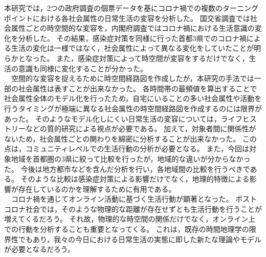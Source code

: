 \documentclass[paper={210mm,297mm},line_length=35zw,number_of_lines=31,head_space=30mm,gutter=40mm,baselineskip=2.0zw,headfoot_verticalposition=1.5zw]{jlreq}
\begin{document}
本研究では，2つの政府調査の個票データを基にコロナ禍での複数のターニングポイントにおける各社会属性の日常生活の変容を分析した。
国交省調査では社会属性ごとの時空間的な変容を，内閣府調査ではコロナ禍における生活意識の変化を分析した。
その結果，感染症対策を同様に行った首都3県でのコロナ禍による生活の変化は一様ではなく，社会属性によって異なる変化をしていたことが明らかとなった。
また，感染症対策によって時空間が変容をするだけでなく，生活の意識も同様に変化することが分かった。\\
　空間的な変容を捉えるために時空間経路図を作成したが，本研究の手法では一部の社会属性は表すことが出来なかった。
各時間帯の最頻値を算出することで社会属性全体のモデル化を行ったため，自宅にいることの多い社会属性や活動を行うタイミングが極端に異なる社会属性の時空間経路図を作成するのには限界があった。
そのようなモデル化しにくい日常生活の変容については，ライフヒストリーなどの質的研究による視点が必要である。
加えて，対象者間に関係性がないため，社会属性ごとの関わりを綿密に分析することが出来なかった。
この点は，コミュニティレベルでの生活行動の分析が必要となる。
また，今回は対象地域を首都圏の3県に絞って比較を行ったが，地域的な違いが分からなかった。
今後は地方都市などを含んだ分析を行い，各地域間の比較を行うべきである。
そのような比較は感染症対策による影響だけでなく，地理的特徴による影響が存在しているのかを理解するために有用である。\\
　コロナ禍を通じてオンライン活動に基づく生活行動が顕著となった。
ポストコロナ社会では，そのような物理的な距離が存在せずとも生活行動を行うことが増えてくるだろう。
それ故，物理的な時空間の関係だけでなく，オンライン上での行動を分析することも重要となってくる。
これは，既存の時間地理学の限界性でもあり，我々の今日における日常生活の実態に即した新たな理論やモデルが必要となるだろう。\\
\end{document}
